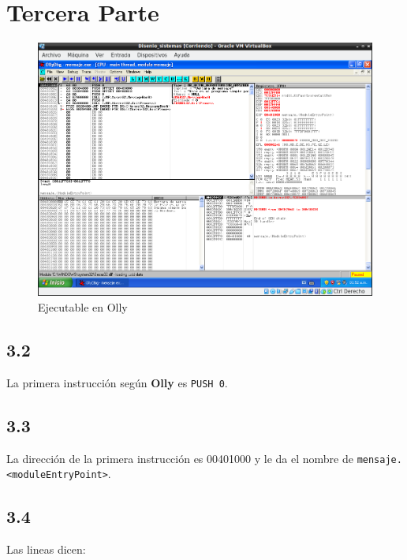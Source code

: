 \section{Tercera Parte}

\begin{figure}[H]
  \includegraphics[width=\linewidth, scale=0.9]{practica3/imagenes/actividad3/olly.png}
  \caption{Ejecutable en Olly}
\end{figure}

\subsection*{3.2}
La primera instrucción según \textbf{Olly} es \verb|PUSH 0|.

\subsection*{3.3}
La dirección de la primera instrucción es 00401000 y le da el nombre de
\verb|mensaje.<moduleEntryPoint>|.

\subsection*{3.4}
Las lineas dicen:

